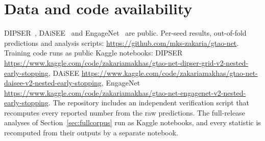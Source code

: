 \section*{Data and code availability}
DIPSER~\cite{marquezcarpintero2025dipser}, DAiSEE~\cite{gupta2016daisee} and EngageNet~\cite{singh2023engagenet} are public. Per-seed results, out-of-fold predictions and analysis scripts: \url{https://github.com/mks-zakaria/gtao-net}. Training code runs as public Kaggle notebooks: DIPSER \url{https://www.kaggle.com/code/zakariamakhas/gtao-net-dipser-grid-v2-nested-early-stopping}, DAiSEE \url{https://www.kaggle.com/code/zakariamakhas/gtao-net-daisee-v2-nested-early-stopping}, EngageNet \url{https://www.kaggle.com/code/zakariamakhas/gtao-net-engagenet-v2-nested-early-stopping}. The repository includes an independent verification script that recomputes every reported number from the raw predictions. The full-release analyses of Section~\ref{sec:fullcorpus} run as Kaggle notebooks, and every statistic is recomputed from their outputs by a separate notebook. 

